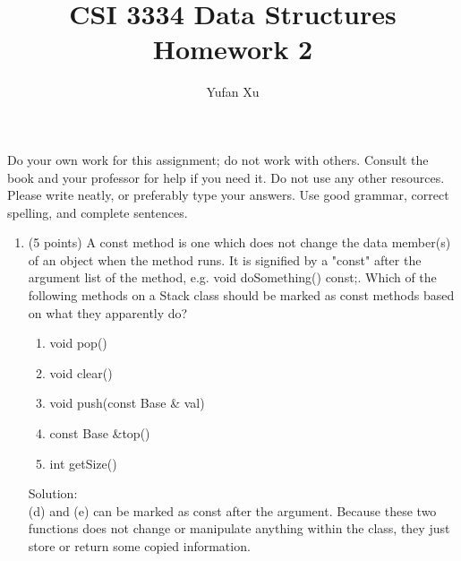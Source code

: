 \documentclass[12pt]{article}
\title{CSI 3334 Data Structures\\Homework 2}
\author{Yufan Xu}
\begin{document}
\thispagestyle{empty}

\maketitle 



Do your own work for this assignment; do not work with others. Consult the book
and your professor for help if you need it. Do not use any other resources. Please write neatly, or preferably
type your answers. Use good grammar, correct spelling, and complete sentences.


\begin{enumerate}

\item (5 points) A const method is one which does not change the data member(s) 
of an object when the method runs. It is signified by a "const" after the argument 
list of the method, e.g. void doSomething() const;. Which of the following methods 
on a Stack class should be marked as const methods based on what they apparently do? 
	\begin{enumerate}
		\item void pop() 
		\item void clear() 
		\item void push(const Base \& val) 
		\item const Base \&top() 
		\item int getSize() 
	\end{enumerate}
Solution:
\\(d) and (e) can be marked as const after the argument. Because these two functions does not change or manipulate anything within the class, they just store or return some copied information.
\\\\


\end{enumerate}
\end{document}
